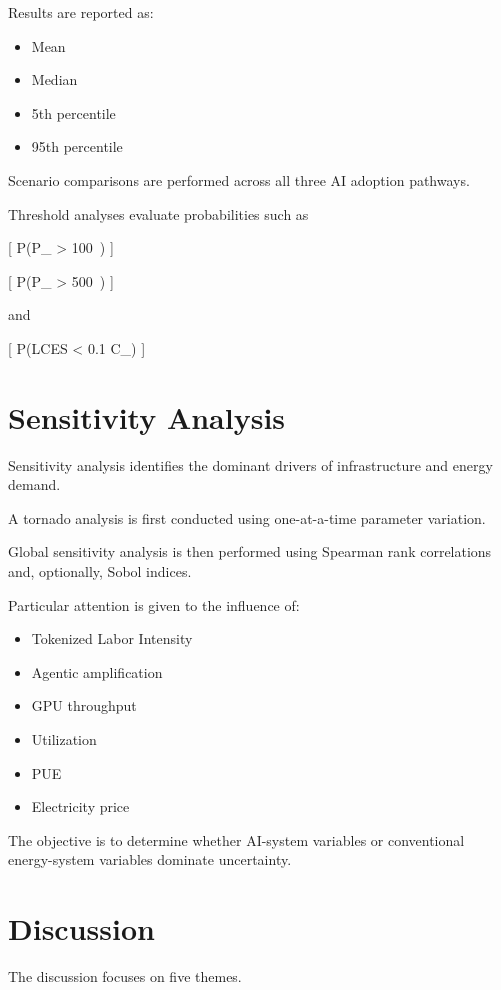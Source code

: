 Results are reported as:

\begin{itemize}
\item Mean
\item Median
\item 5th percentile
\item 95th percentile
\end{itemize}

Scenario comparisons are performed across all three AI adoption pathways.

Threshold analyses evaluate probabilities such as

[
P(P_{} > 100\ )
]

[
P(P_{} > 500\ )
]

and

[
P(LCES < 0.1 \times C_{})
]

\section{Sensitivity Analysis}

Sensitivity analysis identifies the dominant drivers of infrastructure and energy demand.

A tornado analysis is first conducted using one-at-a-time parameter variation.

Global sensitivity analysis is then performed using Spearman rank correlations and, optionally, Sobol indices.

Particular attention is given to the influence of:

\begin{itemize}
\item Tokenized Labor Intensity
\item Agentic amplification
\item GPU throughput
\item Utilization
\item PUE
\item Electricity price
\end{itemize}

The objective is to determine whether AI-system variables or conventional energy-system variables dominate uncertainty.

\section{Discussion}

The discussion focuses on five themes.

